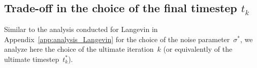 \documentclass[11pt]{article}
\newtheorem{remark}{Remark}
\begin{document}




\subsection{Trade-off in the choice of the final timestep $t_k$}
\label{app:analysis_diffusion}
Similar to the analysis conducted for Langevin in Appendix~\ref{app:analysis_Langevin} for the choice of the noise parameter~$\sigma^*$, we analyze here the choice of the ultimate iteration~$k$ (or equivalently of the ultimate timestep~$t_k^*$). 
\end{document}
